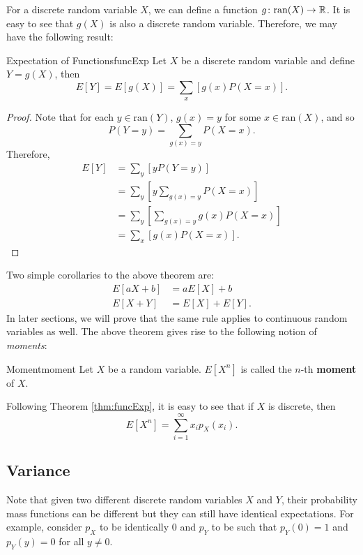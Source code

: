 \documentclass[math]{amznotes}
\theoremstyle{remark}
\begin{document}
For a discrete random variable $X$, we can define a function $g \colon \mathrm{ran}(X) \to \mathbb{R}$. It is easy to see that $g(X)$ is also a discrete random variable. Therefore, we may have the following result:
\begin{thmbox}{Expectation of Functions}{funcExp}
    Let $X$ be a discrete random variable and define $Y = g(X)$, then
    \begin{equation*}
        E[Y] = E[g(X)] = \sum_{x}\left[g(x)P(X = x)\right].
    \end{equation*}
    \tcblower
    \begin{proof}
        Note that for each $y \in \mathrm{ran}(Y)$, $g(x) = y$ for some $x \in \mathrm{ran}(X)$, and so
        \begin{equation*}
            P(Y = y) = \sum_{g(x) = y}P(X = x).
        \end{equation*}
        Therefore,
        \begin{align*}
            E[Y] & = \sum_{y}\left[yP(Y = y)\right] \\
            & = \sum_{y}\left[y\!\sum_{g(x) = y}\!P(X = x)\right] \\
            & = \sum_{y}\left[\sum_{g(x) = y}\!g(x)P(X = x)\right] \\
            & = \sum_{x}\left[g(x)P(X = x)\right].
        \end{align*}
    \end{proof}
\end{thmbox}
Two simple corollaries to the above theorem are:
\begin{align*}
    E[aX + b] & = aE[X] + b \\
    E[X + Y] & = E[X] + E[Y].
\end{align*}
In later sections, we will prove that the same rule applies to continuous random variables as well. The above theorem gives rise to the following notion of \textit{moments}:
\begin{dfnbox}{Moment}{moment}
    Let $X$ be a random variable. $E[X^n]$ is called the $n$-th {\color{red} \textbf{moment}} of $X$.
\end{dfnbox}
Following Theorem \ref{thm:funcExp}, it is easy to see that if $X$ is discrete, then
\begin{equation*}
    E[X^n] = \sum_{i = 1}^{\infty}x_ip_X(x_i).
\end{equation*}

\subsection{Variance}
Note that given two different discrete random variables $X$ and $Y$, their probability mass functions can be different but they can still have identical expectations. For example, consider $p_X$ to be identically $0$ and $p_Y$ to be such that $p_Y(0) = 1$ and $p_Y(y) = 0$ for all $y \neq 0$.
\end{document}
